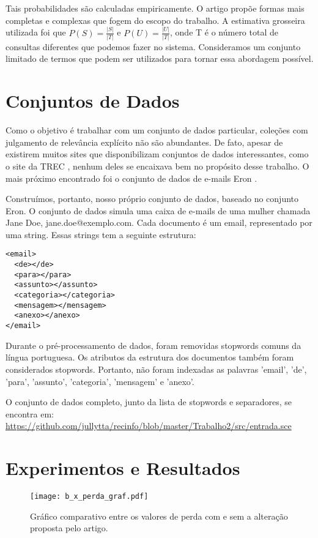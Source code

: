 \documentclass{svproc}
\begin{document}
Tais probabilidades são calculadas empiricamente. O artigo propõe formas mais completas e complexas que fogem do escopo do
trabalho. A estimativa grosseira utilizada foi que $P(S) = \frac{|S|}{|T|}$ e $P(U) = \frac{|U|}{|T|}$, onde T é o número
total de consultas diferentes que podemos fazer no sistema. Consideramos um conjunto limitado de termos que podem ser
utilizados para tornar essa abordagem possível.


\section{Conjuntos de Dados}
Como o objetivo é trabalhar com um conjunto de dados particular, coleções com julgamento de relevância explícito não são
abundantes. De fato, apesar de existirem muitos sites que disponibilizam conjuntos de dados interessantes, como o site da
TREC \cite{trec}, nenhum deles se encaixava bem no propósito desse trabalho. O mais próximo encontrado foi o 
conjunto de dados de e-mails Eron \cite{eron}.

Construímos, portanto, nosso próprio conjunto de dados, baseado no conjunto Eron. O conjunto de dados simula uma caixa de
e-mails de uma mulher chamada Jane Doe, jane.doe@exemplo.com. Cada documento é um email, representado por uma string.
Essas strings tem a seguinte estrutura:

\begin{verbatim}
<email>
  <de></de>
  <para></para>
  <assunto></assunto>
  <categoria></categoria>
  <mensagem></mensagem>
  <anexo></anexo>
</email>
\end{verbatim}

Durante o pré-processamento de dados, foram removidas stopwords comuns da língua portuguesa. Os atributos da estrutura 
dos documentos também foram considerados stopwords. Portanto, não foram indexadas as palavras 'email', 'de',
'para', 'assunto', 'categoria', 'mensagem' e 'anexo'.

O conjunto de dados completo, junto da lista de stopwords e separadores, se encontra em: 
\url{https://github.com/jullytta/recinfo/blob/master/Trabalho2/src/entrada.sce}


\section{Experimentos e Resultados}

\begin{figure}[ht]
  \caption{Gráfico comparativo entre os valores de perda com e sem a alteração proposta pelo artigo.}
  \centering
  \texttt{[image: b\_x\_perda\_graf.pdf]}
\end{figure}
\end{document}
